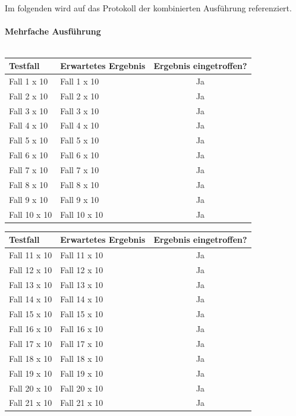 \ \\ \\
Im folgenden wird auf das Protokoll der kombinierten Ausführung referenziert.\ \\ \\
\textbf{Mehrfache Ausführung}\ \\ \\
\begin{tabular}[c]{|p{6cm}|p{6cm}|c|}
\hline
\textbf{Testfall} & \textbf{Erwartetes Ergebnis} & \textbf{Ergebnis eingetroffen?}\\
\hline
Fall 1 x 10 & Fall 1 x 10 & Ja\\
\hline
Fall 2 x 10 & Fall 2 x 10 & Ja\\
\hline
Fall 3 x 10 & Fall 3 x 10 & Ja\\
\hline
Fall 4 x 10 & Fall 4 x 10 & Ja\\
\hline
Fall 5 x 10 & Fall 5 x 10 & Ja\\
\hline
Fall 6 x 10 & Fall 6 x 10 & Ja\\
\hline
Fall 7 x 10 & Fall 7 x 10 & Ja\\
\hline
Fall 8 x 10 & Fall 8 x 10 & Ja\\
\hline
Fall 9 x 10 & Fall 9 x 10 & Ja\\
\hline
Fall 10 x 10 & Fall 10 x 10 & Ja\\
\hline
\end{tabular}
\begin{tabular}[c]{|p{6cm}|p{6cm}|c|}
\hline
\textbf{Testfall} & \textbf{Erwartetes Ergebnis} & \textbf{Ergebnis eingetroffen?}\\
\hline
Fall 11 x 10 & Fall 11 x 10 & Ja\\
\hline
Fall 12 x 10 & Fall 12 x 10 & Ja\\
\hline
Fall 13 x 10 & Fall 13 x 10 & Ja\\
\hline
Fall 14 x 10 & Fall 14 x 10 & Ja\\
\hline
Fall 15 x 10 & Fall 15 x 10 & Ja\\
\hline
Fall 16 x 10 & Fall 16 x 10 & Ja\\
\hline
Fall 17 x 10 & Fall 17 x 10 & Ja\\
\hline
Fall 18 x 10 & Fall 18 x 10 & Ja\\
\hline
Fall 19 x 10 & Fall 19 x 10 & Ja\\
\hline
Fall 20 x 10 & Fall 20 x 10 & Ja\\
\hline
Fall 21 x 10 & Fall 21 x 10 & Ja\\
\hline
\end{tabular}
